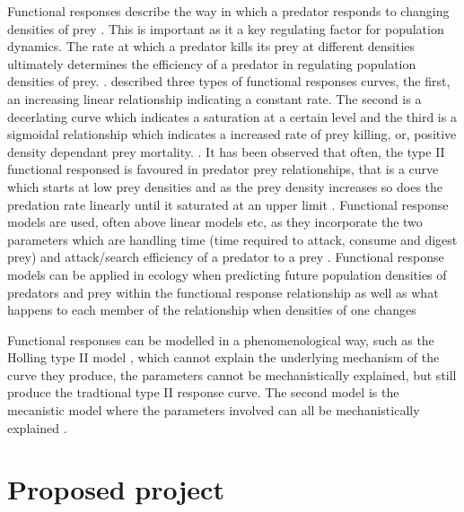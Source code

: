 \documentclass[11pt]{article}
\begin{document}
Functional responses describe the way in which a predator responds to changing densities of prey \cite{Holling1959}. This is important as it a key regulating factor for population dynamics. The rate at which a predator kills its prey at different densities ultimately determines the efficiency of a predator in regulating population densities of prey. \cite{Murdoch1975}. \cite{Holling1959} described three types of functional responses curves, the first, an increasing linear relationship indicating a constant rate. The second is a decerlating curve which indicates a saturation at a certain level and the third is a sigmoidal relationship which indicates a increased rate of prey killing, or, positive density dependant prey mortality. \cite{Pervez2005}. It has been observed that often, the type II functional responsed is favoured in predator prey relationships, that is a curve which starts at low prey densities and as the prey density increases so does the predation rate linearly until it saturated at an upper limit \cite{Jeschke2002}. Functional response models are used, often above linear models etc, as they incorporate the two parameters which are handling time (time required to attack, consume and digest prey) and attack/search efficiency of a predator to a prey \cite{Fathipour2016}. Functional response models can be applied in ecology when predicting future population densities of predators and prey within the functional response relationship as well as what happens to each member of the relationship when densities of one changes \cite{Jeschke2002}

Functional responses can be modelled in a phenomenological way, such as the Holling type II model \cite{Holling1959}, which cannot explain the underlying mechanism of the curve they produce, the parameters cannot be mechanistically explained, but still produce the tradtional type II response curve. The second model is the mecanistic model where the parameters involved can all be mechanistically explained \cite{Jeschke2002}.


	\section{Proposed project}
	\noindent
	
\end{document}
